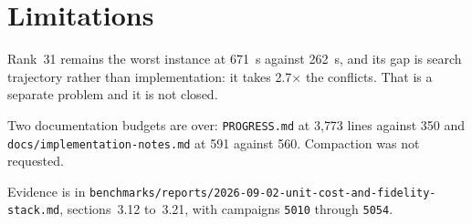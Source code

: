 \documentclass[11pt]{article}
\newcommand{\code}[1]{\texttt{#1}}
\begin{document}
\section{Limitations}

Rank~31 remains the worst instance at 671~s against 262~s, and its gap is search
trajectory rather than implementation: it takes 2.7$\times$ the conflicts. That
is a separate problem and it is not closed.

Two documentation budgets are over: \code{PROGRESS.md} at 3{,}773 lines against
350 and \code{docs/implementation-notes.md} at 591 against 560. Compaction was
not requested.

Evidence is in
\code{benchmarks/reports/2026-09-02-unit-cost-and-fidelity-stack.md},
sections~3.12 to~3.21, with campaigns \code{5010} through \code{5054}.
\end{document}
